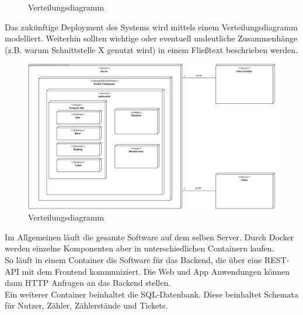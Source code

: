 \begin{figure}[h]
	\centering
	\caption{Verteilungsdiagramm}
	\label{fig:verteilungsdiagramm}
\end{figure}

\begin{tcolorbox}
	Das zukünftige Deployment des Systems wird mittels einem Verteilungsdiagramm modelliert.
	Weiterhin sollten wichtige oder eventuell undeutliche Zusammenhänge (z.B. warum Schnittstelle X genutzt wird) in einem Fließtext beschrieben werden.
\end{tcolorbox}

\begin{figure}[H]
	\centering
	\caption{Verteilungsdiagramm}
	\includegraphics[width=16cm]{img/diagrams/DeploymentDiagram}
\end{figure}

Im Allgemeinen läuft die gesamte Software auf dem selben Server. Durch Docker werden einzelne Komponenten aber in unterschiedlichen Containern laufen.\\
So läuft in einem Container die Software für das Backend, die über eine REST-API mit dem Frontend kommuniziert. Die Web und App Anwendungen können dann HTTP Anfragen an das Backend stellen.\\
Ein weiterer Container beinhaltet die SQL-Datenbank. Diese beinhaltet Schemata für Nutzer, Zähler, Zählerstände und Tickets.
